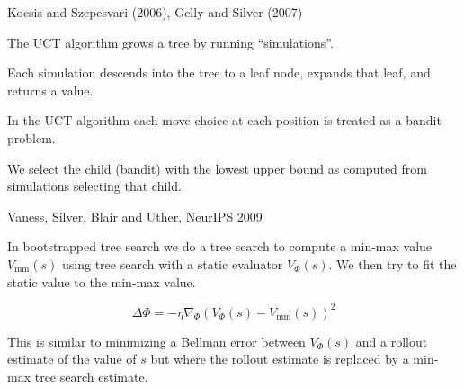 {
{Kocsis and Szepesvari (2006), Gelly and Silver (2007)}

The UCT algorithm grows a tree by running ``simulations''.

\vfill
Each simulation descends into the tree to a leaf node, expands that leaf, and returns a value.

\vfill
In the UCT algorithm each move choice at each position is treated as a bandit problem.

\vfill
We select the child (bandit) with the lowest upper bound as computed from simulations selecting that child.


{Vaness, Silver, Blair and Uther, NeurIPS 2009}

In bootstrapped tree search we do a tree search to compute a min-max value $V_{\mathrm{mm}}(s)$
using tree search with a static evaluator $V_\Phi(s)$.  We then try to fit the static value to the min-max value.

\vfill
$$\Delta \Phi = - \eta \nabla_\Phi \left(V_\Phi(s) - V_{\mathrm{mm}}(s)\right)^2$$

\vfill
This is similar to minimizing a Bellman error between $V_\Phi(s)$ and a rollout estimate of the value of $s$ but where the rollout
estimate is replaced by a min-max tree search estimate.


}

